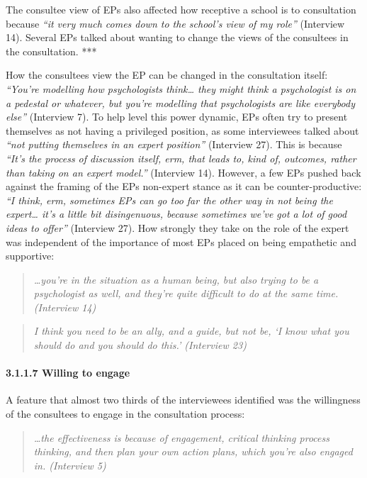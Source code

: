 \documentclass[
]{article}
\begin{document}
The consultee view of EPs also affected how receptive a school is to
consultation because \emph{``it very much comes down to the school's
view of my role''} (Interview 14). Several EPs talked about wanting to
change the views of the consultees in the consultation. ***

How the consultees view the EP can be changed in the consultation
itself: \emph{``You're modelling how psychologists think\ldots{} they
might think a psychologist is on a pedestal or whatever, but you're
modelling that psychologists are like everybody else''} (Interview 7).
To help level this power dynamic, EPs often try to present themselves as
not having a privileged position, as some interviewees talked about
\emph{``not putting themselves in an expert position''} (Interview 27).
This is because \emph{``It's the process of discussion itself, erm, that
leads to, kind of, outcomes, rather than taking on an expert model.''}
(Interview 14). However, a few EPs pushed back against the framing of
the EPs non-expert stance as it can be counter-productive: \emph{``I
think, erm, sometimes EPs can go too far the other way in not being the
expert\ldots{} it's a little bit disingenuous, because sometimes we've
got a lot of good ideas to offer''} (Interview 27). How strongly they
take on the role of the expert was independent of the importance of most
EPs placed on being empathetic and supportive:

\begin{quote}
\emph{\ldots you're in the situation as a human being, but also trying
to be a psychologist as well, and they're quite difficult to do at the
same time. (Interview 14)}
\end{quote}

\begin{quote}
\emph{I think you need to be an ally, and a guide, but not be, `I know
what you should do and you should do this.' (Interview 23)}
\end{quote}

\hypertarget{willing-to-engage}{%
\paragraph{3.1.1.7 Willing to engage}\label{willing-to-engage}}

A feature that almost two thirds of the interviewees identified was the
willingness of the consultees to engage in the consultation process:

\begin{quote}
\emph{\ldots the effectiveness is because of engagement, critical
thinking process thinking, and then plan your own action plans, which
you're also engaged in. (Interview 5)}
\end{quote}
\end{document}
